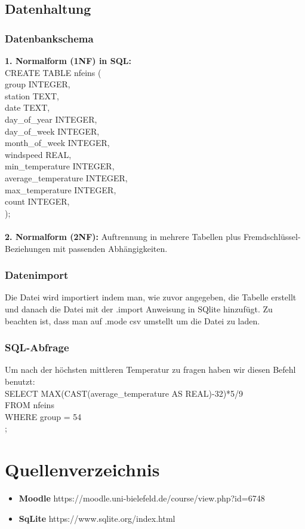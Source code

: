 \documentclass{article}
\begin{document}
\subsection{Datenhaltung}
\subsubsection{Datenbankschema}

\textbf{1. Normalform (1NF) in SQL: }
\\
CREATE  TABLE nfeins ( \\
group INTEGER,\\ 
station TEXT,\\
date TEXT,\\
day\_of\_year INTEGER,\\
day\_of\_week INTEGER,\\
month\_of\_week INTEGER,\\
windspeed REAL,\\
min\_temperature INTEGER,\\
average\_temperature INTEGER,\\
max\_temperature INTEGER,\\
count INTEGER,\\
);\\
\\
\textbf{2. Normalform (2NF): }
Auftrennung in mehrere Tabellen plus Fremdschlüssel-Beziehungen mit passenden Abhängigkeiten.

\subsubsection{Datenimport}

Die Datei wird importiert indem man, wie zuvor angegeben, die Tabelle erstellt und danach die Datei mit der .import Anweisung in SQlite hinzufügt. Zu beachten ist, dass man auf .mode csv umstellt um die Datei zu laden. 

\subsubsection{SQL-Abfrage}

Um nach der höchsten mittleren Temperatur zu fragen haben wir diesen Befehl benutzt:
\\
SELECT MAX(CAST(average\_temperature AS REAL)-32)*5/9 \\
FROM nfeins \\
WHERE group = 54\\
;\\





\newpage
\section{Quellenverzeichnis}

\begin{itemize}
    \item \textbf{Moodle} https://moodle.uni-bielefeld.de/course/view.php?id=6748
    \item \textbf{SqLite} https://www.sqlite.org/index.html
\end{itemize}

\newpage



\end{document}
